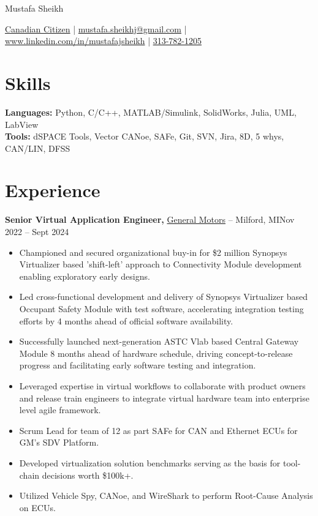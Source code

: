 \documentclass[11pt]{article}       %
\begin{document}
\centerline{\Huge Mustafa Sheikh}

\vspace{5pt}

\centerline{\href{}{Canadian Citizen} | \href{mailto:mustafa.sheikhj@gmail.com}{mustafa.sheikhj@gmail.com} | \href{wwww.linkedin.com/in/mustafajsheikh}{www.linkedin.com/in/mustafajsheikh} | \href{}{313-782-1205}}

\vspace{-10pt}

\section*{Skills}
\textbf{Languages:} Python, C/C++, MATLAB/Simulink, SolidWorks, Julia, UML, LabView \\
\textbf{Tools:} dSPACE Tools, Vector CANoe, SAFe, Git, SVN, Jira, 8D, 5 whys, CAN/LIN, DFSS \\

\vspace{-6.5pt}

\section*{Experience}
\textbf{Senior Virtual Application Engineer,} \href{}{General Motors} -- Milford, MI\hfill Nov 2022 -- Sept 2024\\
\vspace{-9pt}
\begin{itemize}
  \item Championed and secured organizational buy-in for \$2 million Synopsys Virtualizer based 'shift-left' approach to Connectivity Module development enabling exploratory early designs.
  \item Led cross-functional development and delivery of Synopsys Virtualizer based Occupant Safety Module with test software, accelerating integration testing efforts by 4 months ahead of official software availability.
  \item Successfully launched next-generation ASTC Vlab based Central Gateway Module 8 months ahead of hardware schedule, driving concept-to-release progress and facilitating early software testing and integration.
  \item Leveraged expertise in virtual workflows to collaborate with product owners and release train engineers to integrate virtual hardware team into enterprise level agile framework.
  \item Scrum Lead for team of 12 as part SAFe for CAN and Ethernet ECUs for GM’s SDV Platform.
  \item Developed virtualization solution benchmarks serving as the basis for tool-chain decisions worth \$100k+.
  \item Utilized Vehicle Spy, CANoe, and WireShark to perform Root-Cause Analysis on ECUs.
\end{itemize}
\end{document}
